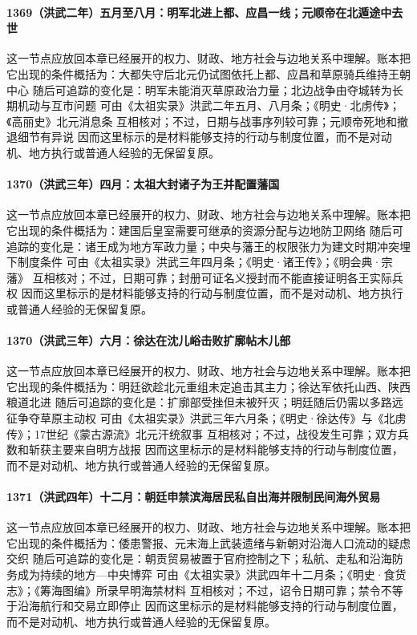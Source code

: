 \paragraph{1369（洪武二年）五月至八月：明军北进上都、应昌一线；元顺帝在北遁途中去世} 这一节点应放回本章已经展开的权力、财政、地方社会与边地关系中理解。账本把它出现的条件概括为：大都失守后北元仍试图依托上都、应昌和草原骑兵维持王朝中心 随后可追踪的变化是：明军未能消灭草原政治力量；北边战争由夺城转为长期机动与互市问题 可由《太祖实录》洪武二年五月、八月条；《明史·北虏传》；《高丽史》北元消息条 互相核对；不过，日期与战事序列较可靠；元顺帝死地和撤退细节有异说 因而这里标示的是材料能够支持的行动与制度位置，而不是对动机、地方执行或普通人经验的无保留复原。

\paragraph{1370（洪武三年）四月：太祖大封诸子为王并配置藩国} 这一节点应放回本章已经展开的权力、财政、地方社会与边地关系中理解。账本把它出现的条件概括为：建国后皇室需要可继承的资源分配与边地防卫网络 随后可追踪的变化是：诸王成为地方军政力量；中央与藩王的权限张力为建文时期冲突埋下制度条件 可由《太祖实录》洪武三年四月条；《明史·诸王传》；《明会典·宗藩》 互相核对；不过，日期可靠；封册可证名义授封而不能直接证明各王实际兵权 因而这里标示的是材料能够支持的行动与制度位置，而不是对动机、地方执行或普通人经验的无保留复原。

\paragraph{1370（洪武三年）六月：徐达在沈儿峪击败扩廓帖木儿部} 这一节点应放回本章已经展开的权力、财政、地方社会与边地关系中理解。账本把它出现的条件概括为：明廷欲趁北元重组未定追击其主力；徐达军依托山西、陕西粮道北进 随后可追踪的变化是：扩廓部受挫但未被歼灭；明廷随后仍需以多路远征争夺草原主动权 可由《太祖实录》洪武三年六月条；《明史·徐达传》与《北虏传》；17世纪《蒙古源流》北元汗统叙事 互相核对；不过，战役发生可靠；双方兵数和斩获主要来自明方战报 因而这里标示的是材料能够支持的行动与制度位置，而不是对动机、地方执行或普通人经验的无保留复原。

\paragraph{1371（洪武四年）十二月：朝廷申禁滨海居民私自出海并限制民间海外贸易} 这一节点应放回本章已经展开的权力、财政、地方社会与边地关系中理解。账本把它出现的条件概括为：倭患警报、元末海上武装遗绪与新朝对沿海人口流动的疑虑交织 随后可追踪的变化是：朝贡贸易被置于官府控制之下；私航、走私和沿海防务成为持续的地方—中央博弈 可由《太祖实录》洪武四年十二月条；《明史·食货志》；《筹海图编》所录早明海禁材料 互相核对；不过，诏令日期可靠；禁令不等于沿海航行和交易立即停止 因而这里标示的是材料能够支持的行动与制度位置，而不是对动机、地方执行或普通人经验的无保留复原。

